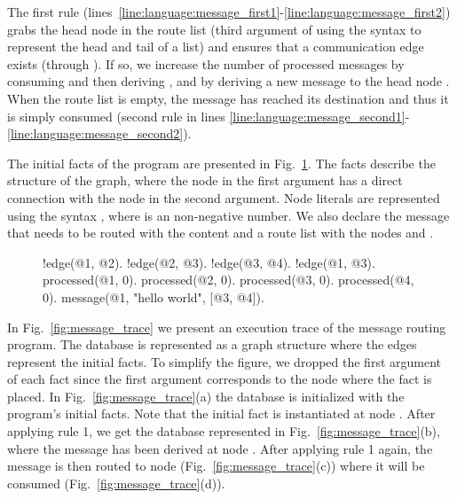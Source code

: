 The first rule
(lines~\ref{line:language:message_first1}-\ref{line:language:message_first2})
grabs the head node  in the route list (third argument of 
using the syntax \code{[B | L]} to represent the head and tail of a list) and
ensures that a communication edge exists (through ). If so, we
increase the number of processed messages by consuming 
and then deriving , and by deriving a new message to
the head node .  When the route list is empty, the message has reached
its destination and thus it is simply consumed (second rule in lines
\ref{line:language:message_second1}-\ref{line:language:message_second2}).

The initial facts of the program are presented in
Fig.~\ref{code:language:message_facts}. The  facts describe the
structure of the graph, where the node in the first argument has a direct
connection with the node in the second argument. Node literals are represented
using the syntax , where  is an non-negative number. We also
declare the message that needs to be routed with the content  and a route list with the nodes  and .

\begin{figure}[h!]
\begin{LineCode}[commandchars=\*\{\}]
!edge(@1, @2). !edge(@2, @3).
!edge(@3, @4). !edge(@1, @3).
processed(@1, 0). processed(@2, 0).
processed(@3, 0). processed(@4, 0).
message(@1, "hello world", [@3, @4]).
\end{LineCode}
\label{code:language:message_facts}
\end{figure}

In Fig.~\ref{fig:message_trace} we present an execution trace of the message
routing program. The database is represented as a graph structure where the
edges represent the  initial facts. To simplify the figure, we
dropped the first argument of each fact since the first argument corresponds to
the node where the fact is placed. In Fig.~\ref{fig:message_trace}(a) the
database is initialized with the program's initial facts. Note that the initial
 fact is instantiated at node . After applying rule 1, we
get the database represented in Fig.~\ref{fig:message_trace}(b), where the
message has been derived at node . After applying rule 1 again, the
message is then routed to node  (Fig.~\ref{fig:message_trace}(c))
where it will be consumed (Fig.~\ref{fig:message_trace}(d)).

